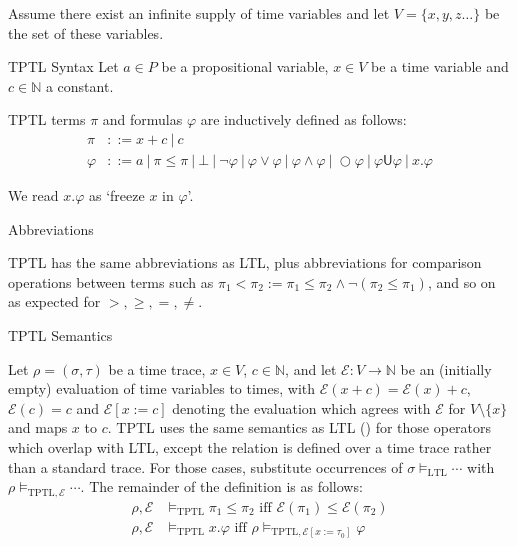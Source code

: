 \documentclass[a4paper]{article}
\newcommand{\U}{\mathsf{U}}
\newcommand{\tiff}{\text{ iff }}
\newcommand{\eval}{\mathcal{E}}
\begin{document}
Assume there exist an infinite supply of time variables  and let $V=\{x,y,z\dots\}$ be the set of these variables.

\begin{defn}{TPTL Syntax}\label{tptlsyn}
  Let $a\in P$ be a propositional variable, $x\in V$ be a time variable and $c\in\mathbb{N}$ a constant.

  TPTL terms $\pi$ and formulas $\varphi$ are inductively defined as follows:
  \begin{align*}
    \pi &::= x + c ~|~ c\\
    \varphi &::= a ~|~ \pi \leq \pi ~|~ \bot ~|~ \neg \varphi ~|~\varphi \lor \varphi ~|~ \varphi \land \varphi ~|~ \bigcirc \varphi ~|~ \varphi \U \varphi ~|~ x. \varphi
  \end{align*}
\end{defn}

We read $x. \varphi$ as `freeze $x$ in $\varphi$'.

\begin{notn}{Abbreviations}\label{tptlabbrev}

  TPTL has the same abbreviations as LTL, plus abbreviations for comparison operations between terms such as $\pi_1 < \pi_2 := \pi_1 \leq \pi_2 \land \neg(\pi_2 \leq \pi_1)$, and so on as expected for $>,\geq,=,\neq$.
\end{notn}

\begin{defn}{TPTL Semantics}\label{tptlsem}

  Let $\rho = (\sigma,\tau)$ be a time trace, $x\in V$, $c\in\mathbb{N}$, and let $\eval:V\to\mathbb{N}$ be an (initially empty) evaluation of time variables to times, with $\eval(x + c) = \eval(x) + c$, $\eval(c) = c$ and $\eval[x:=c]$ denoting the evaluation which agrees with $\eval$ for $V\setminus\{x\}$ and maps $x$ to $c$.
  TPTL uses the same semantics as LTL () for those operators which overlap with LTL, except the relation is defined over a time trace rather than a standard trace. For those cases, substitute occurrences of $\sigma\vDash_{\text{LTL}}\cdots$ with $\rho\vDash_{\text{TPTL},\eval}\cdots$. The remainder of the definition is as follows:
  \begin{align*}
    \rho,\eval &\vDash_{\text{TPTL}}\pi_1\leq\pi_2 \tiff \eval(\pi_1)\leq\eval(\pi_2)\\
    \rho,\eval &\vDash_{\text{TPTL}} x.\varphi \tiff \rho\vDash_{\text{TPTL},\eval[x:=\tau_0]}\varphi
  \end{align*}
\end{defn}
\end{document}
